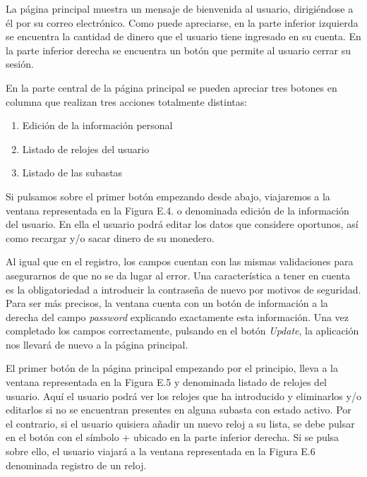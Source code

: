 
	La página principal muestra un mensaje de bienvenida al usuario, dirigiéndose a él por su correo electrónico. Como puede apreciarse, en la parte inferior izquierda se encuentra la cantidad de dinero que el usuario tiene ingresado en su cuenta. En la parte inferior derecha se encuentra un botón que permite al usuario cerrar su sesión.
	
	En la parte central de la página principal se pueden apreciar tres botones en columna que realizan tres acciones totalmente distintas:
	\begin{enumerate}
		\item Edición de la información personal
		\item Listado de relojes del usuario
		\item Listado de las subastas
	\end{enumerate}
	
	Si pulsamos sobre el primer botón empezando desde abajo, viajaremos a la ventana representada en la Figura E.4. o denominada edición de la información del usuario. En ella el usuario podrá editar los datos que considere oportunos, así como recargar y/o sacar dinero de su monedero.
	

	Al igual que en el registro, los campos cuentan con las mismas validaciones para asegurarnos de que no se da lugar al error. Una característica a tener en cuenta es la obligatoriedad a introducir la contraseña de nuevo por motivos de seguridad. Para ser más precisos, la ventana cuenta con un botón de información a la derecha del campo \emph{password} explicando exactamente esta información. Una vez completado los campos correctamente, pulsando en el botón \emph{Update}, la aplicación nos llevará de nuevo a la página principal.
	
	El primer botón de la página principal empezando por el principio, lleva a la ventana representada en la Figura E.5 y denominada listado de relojes del usuario. Aquí el usuario podrá ver los relojes que ha introducido y eliminarlos y/o editarlos si no se encuentran presentes en alguna subasta con estado activo. Por el contrario, si el usuario quisiera añadir un nuevo reloj a su lista, se debe pulsar en el botón con el símbolo + ubicado en la parte inferior derecha. Si se pulsa sobre ello, el usuario viajará a la ventana representada en la Figura E.6 denominada registro de un reloj.

